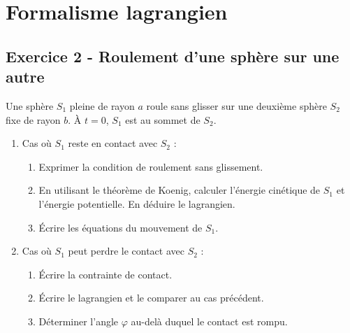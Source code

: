 \documentclass[12pt,a4paper]{article}
\begin{document}
\section{Formalisme lagrangien}

\subsection*{Exercice 2 - Roulement d'une sphère sur une autre \niveau{\difficile}}

\begin{boiteexercice}
Une sphère $S_1$ pleine de rayon $a$ roule sans glisser sur une deuxième sphère $S_2$ fixe de rayon $b$. À $t = 0$, $S_1$ est au sommet de $S_2$.

\begin{enumerate}
  \item Cas où $S_1$ reste en contact avec $S_2$ :
  \begin{enumerate}
    \item[a)] Exprimer la condition de roulement sans glissement.
    \item[b)] En utilisant le théorème de Koenig, calculer l'énergie cinétique de $S_1$ et l'énergie potentielle. En déduire le lagrangien.
    \item[c)] Écrire les équations du mouvement de $S_1$.
  \end{enumerate}
  \item Cas où $S_1$ peut perdre le contact avec $S_2$ :
  \begin{enumerate}
    \item[a)] Écrire la contrainte de contact.
    \item[b)] Écrire le lagrangien et le comparer au cas précédent.
    \item[c)] Déterminer l'angle $\varphi$ au-delà duquel le contact est rompu.
  \end{enumerate}
\end{enumerate}
\end{boiteexercice}
\end{document}
